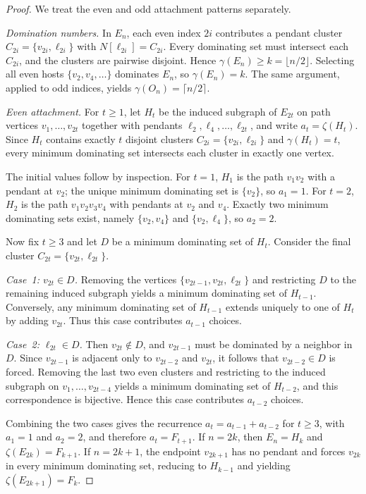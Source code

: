 \documentclass[11pt]{article}
\theoremstyle{definition}
\theoremstyle{remark}
\begin{document}
\begin{proof}
We treat the even and odd attachment patterns separately.

\smallskip
\noindent\emph{Domination numbers.}
In $E_n$, each even index $2i$ contributes a pendant cluster
$C_{2i}=\{v_{2i},\ell_{2i}\}$ with $N[\ell_{2i}]=C_{2i}$.
Every dominating set must intersect each $C_{2i}$, and the clusters are pairwise disjoint.
Hence $\gamma(E_n)\ge k=\lfloor n/2\rfloor$.
Selecting all even hosts $\{v_2,v_4,\dots\}$ dominates $E_n$, so $\gamma(E_n)=k$.
The same argument, applied to odd indices, yields $\gamma(O_n)=\lceil n/2\rceil$.

\smallskip
\noindent\emph{Even attachment.}
For $t\ge 1$, let $H_t$ be the induced subgraph of $E_{2t}$ on path vertices
$v_1,\dots,v_{2t}$ together with pendants $\ell_2,\ell_4,\dots,\ell_{2t}$,
and write $a_t=\zeta(H_t)$.
Since $H_t$ contains exactly $t$ disjoint clusters $C_{2i}=\{v_{2i},\ell_{2i}\}$ and
$\gamma(H_t)=t$, every minimum dominating set intersects each cluster in exactly one vertex.

The initial values follow by inspection.
For $t=1$, $H_1$ is the path $v_1v_2$ with a pendant at $v_2$; the unique minimum
dominating set is $\{v_2\}$, so $a_1=1$.
For $t=2$, $H_2$ is the path $v_1v_2v_3v_4$ with pendants at $v_2$ and $v_4$.
Exactly two minimum dominating sets exist, namely $\{v_2,v_4\}$ and $\{v_2,\ell_4\}$,
so $a_2=2$.

Now fix $t\ge 3$ and let $D$ be a minimum dominating set of $H_t$.
Consider the final cluster $C_{2t}=\{v_{2t},\ell_{2t}\}$.

\emph{Case~1: $v_{2t}\in D$.}
Removing the vertices $\{v_{2t-1},v_{2t},\ell_{2t}\}$ and restricting $D$ to the
remaining induced subgraph yields a minimum dominating set of $H_{t-1}$.
Conversely, any minimum dominating set of $H_{t-1}$ extends uniquely to one of $H_t$
by adding $v_{2t}$.
Thus this case contributes $a_{t-1}$ choices.

\emph{Case~2: $\ell_{2t}\in D$.}
Then $v_{2t}\notin D$, and $v_{2t-1}$ must be dominated by a neighbor in $D$.
Since $v_{2t-1}$ is adjacent only to $v_{2t-2}$ and $v_{2t}$, it follows that
$v_{2t-2}\in D$ is forced.
Removing the last two even clusters and restricting to the induced subgraph on
$v_1,\dots,v_{2t-4}$ yields a minimum dominating set of $H_{t-2}$, and this correspondence
is bijective.
Hence this case contributes $a_{t-2}$ choices.

Combining the two cases gives the recurrence $a_t=a_{t-1}+a_{t-2}$ for $t\ge 3$,
with $a_1=1$ and $a_2=2$, and therefore $a_t=F_{t+1}$.
If $n=2k$, then $E_n=H_k$ and $\zeta(E_{2k})=F_{k+1}$.
If $n=2k+1$, the endpoint $v_{2k+1}$ has no pendant and forces $v_{2k}$ in every
minimum dominating set, reducing to $H_{k-1}$ and yielding $\zeta(E_{2k+1})=F_k$.


\end{proof}
\end{document}

